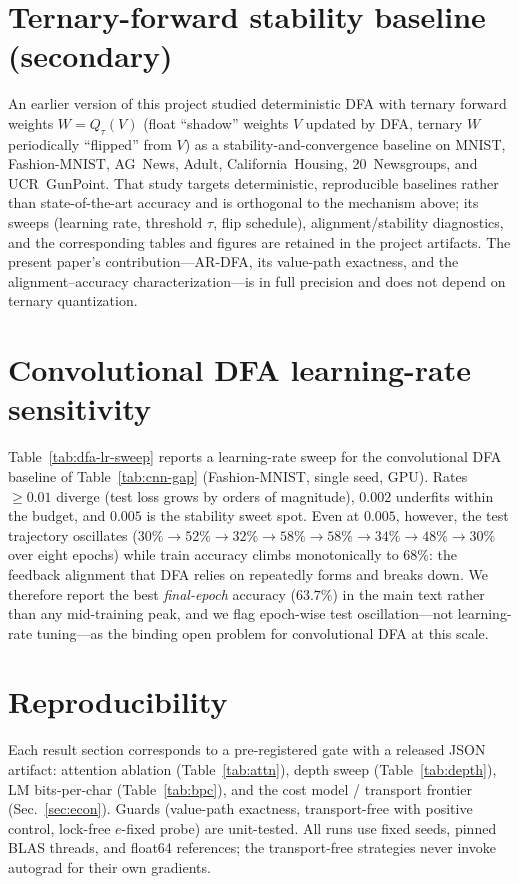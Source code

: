 \documentclass[11pt]{article}
\newcommand{\ARDFA}{\textsc{AR-DFA}}
\begin{document}



\appendix
\section{Ternary-forward stability baseline (secondary)}\label{app:ternary}
An earlier version of this project studied deterministic DFA with ternary forward weights $W=Q_\tau(V)$ (float ``shadow'' weights $V$ updated by DFA, ternary $W$ periodically ``flipped'' from $V$) as a stability-and-convergence baseline on MNIST, Fashion-MNIST, AG~News, Adult, California~Housing, 20~Newsgroups, and UCR~GunPoint. That study targets deterministic, reproducible baselines rather than state-of-the-art accuracy and is orthogonal to the mechanism above; its sweeps (learning rate, threshold $\tau$, flip schedule), alignment/stability diagnostics, and the corresponding tables and figures are retained in the project artifacts. The present paper's contribution---\ARDFA, its value-path exactness, and the alignment--accuracy characterization---is in full precision and does not depend on ternary quantization.

\section{Convolutional DFA learning-rate sensitivity}\label{app:dfa-lr}
Table~\ref{tab:dfa-lr-sweep} reports a learning-rate sweep for the convolutional DFA baseline of Table~\ref{tab:cnn-gap} (Fashion-MNIST, single seed, GPU). Rates $\geq 0.01$ diverge (test loss grows by orders of magnitude), $0.002$ underfits within the budget, and $0.005$ is the stability sweet spot. Even at $0.005$, however, the test trajectory oscillates ($30\%\to52\%\to32\%\to58\%\to58\%\to34\%\to48\%\to30\%$ over eight epochs) while train accuracy climbs monotonically to $68\%$: the feedback alignment that DFA relies on repeatedly forms and breaks down. We therefore report the best \emph{final-epoch} accuracy ($63.7\%$) in the main text rather than any mid-training peak, and we flag epoch-wise test oscillation---not learning-rate tuning---as the binding open problem for convolutional DFA at this scale.


\section{Reproducibility}\label{app:repro}
Each result section corresponds to a pre-registered gate with a released JSON artifact: attention ablation (Table~\ref{tab:attn}), depth sweep (Table~\ref{tab:depth}), LM bits-per-char (Table~\ref{tab:bpc}), and the cost model / transport frontier (Sec.~\ref{sec:econ}). Guards (value-path exactness, transport-free with positive control, lock-free $e$-fixed probe) are unit-tested. All runs use fixed seeds, pinned BLAS threads, and float64 references; the transport-free strategies never invoke autograd for their own gradients.
\end{document}
